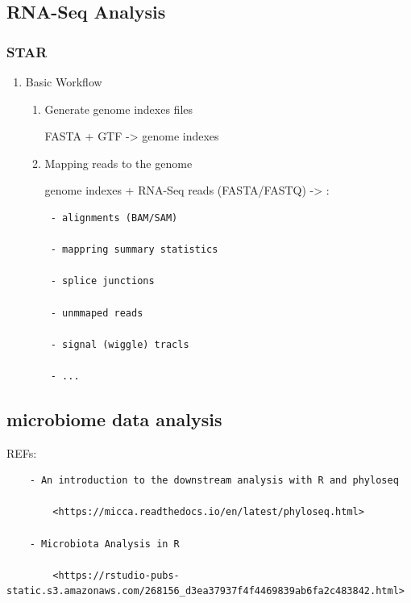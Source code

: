 \documentclass[
]{book}
\begin{document}
\hypertarget{rna-seq-analysis}{%
\subsection{RNA-Seq Analysis}\label{rna-seq-analysis}}

\hypertarget{star}{%
\subsubsection{STAR}\label{star}}

\begin{enumerate}
\def\labelenumi{\arabic{enumi})}
\item
  Basic Workflow

  \begin{enumerate}
  \def\labelenumii{\arabic{enumii}.}
  \item
    Generate genome indexes files

    FASTA + GTF -\textgreater{} genome indexes
  \item
    Mapping reads to the genome

    genome indexes + RNA-Seq reads (FASTA/FASTQ) -\textgreater{} :

\begin{verbatim}
 - alignments (BAM/SAM)

 - mappring summary statistics

 - splice junctions

 - unmmaped reads

 - signal (wiggle) tracls

 - ...
\end{verbatim}
  \end{enumerate}
\end{enumerate}

\hypertarget{microbiome-data-analysis}{%
\subsection{microbiome data analysis}\label{microbiome-data-analysis}}

REFs:

\begin{verbatim}
    - An introduction to the downstream analysis with R and phyloseq

        <https://micca.readthedocs.io/en/latest/phyloseq.html>

    - Microbiota Analysis in R

        <https://rstudio-pubs-static.s3.amazonaws.com/268156_d3ea37937f4f4469839ab6fa2c483842.html>
\end{verbatim}
\end{document}
